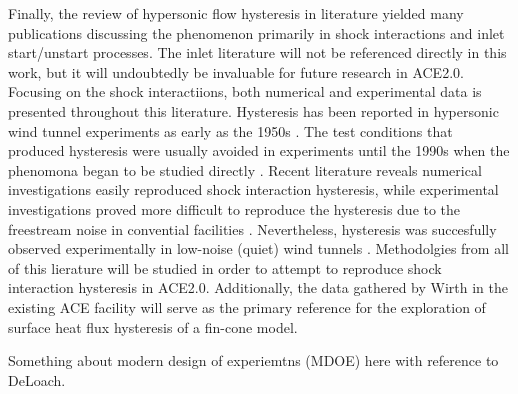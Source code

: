 Finally, the review of hypersonic flow hysteresis in literature yielded many publications discussing the phenomenon primarily in shock interactions and inlet start/unstart processes. The inlet literature will not be referenced directly in this work, but it will undoubtedly be invaluable for future research in ACE2.0. Focusing on the shock interactiions, both numerical and experimental data is presented throughout this literature. Hysteresis has been reported in hypersonic wind tunnel experiments as early as the 1950s \cite{kenworthy,beastall}. The test conditions that produced hysteresis were usually avoided in experiments until the 1990s when the phenomona began to be studied directly \cite{chpoun,ben-dor-1,durand}. Recent literature reveals numerical investigations easily reproduced shock interaction hysteresis, while experimental investigations proved more difficult to reproduce the hysteresis due to the freestream noise in convential facilities \cite{laguarda}. Nevertheless, hysteresis was succesfully observed experimentally in low-noise (quiet) wind tunnels \cite{ivanov,setoguchi,tao}. Methodolgies from all of this lierature will be studied in order to attempt to reproduce shock interaction hysteresis in ACE2.0. Additionally, the data gathered by Wirth \cite{wirth} in the existing ACE facility will serve as the primary reference for the exploration of surface heat flux hysteresis of a fin-cone model. 

Something about modern design of experiemtns (MDOE) here with reference to DeLoach.
